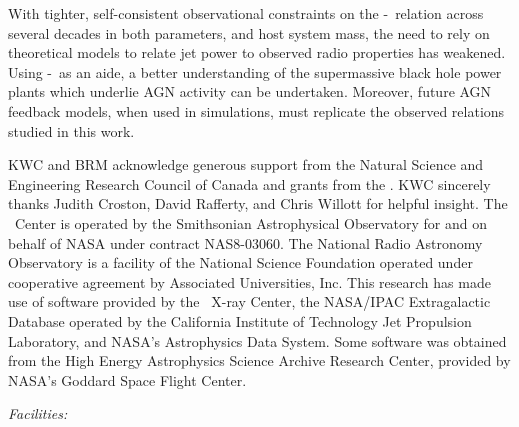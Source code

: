 \documentclass{emulateapj}
\begin{document}
With tighter, self-consistent observational constraints on the
\pjet-\prad\ relation across several decades in both parameters, and
host system mass, the need to rely on theoretical models to relate jet
power to observed radio properties has weakened. Using \pjet-\prad\ as
an aide, a better understanding of the supermassive black hole power
plants which underlie AGN activity can be undertaken. Moreover, future
AGN feedback models, when used in simulations, must replicate the
observed relations studied in this work.

\acknowledgements

KWC and BRM acknowledge generous support from the Natural Science and
Engineering Research Council of Canada and grants from the \cxo. KWC
sincerely thanks Judith Croston, David Rafferty, and Chris Willott for
helpful insight. The \cxo\ Center is operated by the Smithsonian
Astrophysical Observatory for and on behalf of NASA under contract
NAS8-03060. The National Radio Astronomy Observatory is a facility of
the National Science Foundation operated under cooperative agreement
by Associated Universities, Inc. This research has made use of
software provided by the \chandra\ X-ray Center, the NASA/IPAC
Extragalactic Database operated by the California Institute of
Technology Jet Propulsion Laboratory, and NASA's Astrophysics Data
System. Some software was obtained from the High Energy Astrophysics
Science Archive Research Center, provided by NASA's Goddard Space
Flight Center.


{\it Facilities:}  





\clearpage



\end{document}
